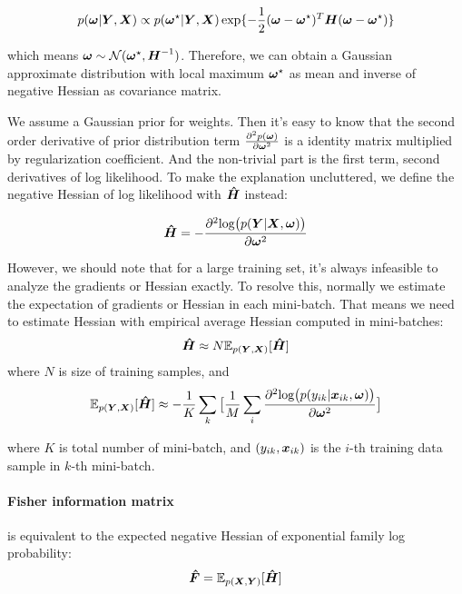\begin{equation}
\begin{aligned}\label{gaussian form}
p(\boldsymbol \omega | \boldsymbol Y, \boldsymbol X) \propto p(\boldsymbol \omega^\star|\boldsymbol Y, \boldsymbol X)\exp\{-\frac{1}{2}(\boldsymbol \omega - \boldsymbol \omega^\star)^T\boldsymbol H (\boldsymbol \omega - \boldsymbol \omega^\star)\}
\end{aligned}
\end{equation}

which means $\boldsymbol \omega \sim \mathcal N(\boldsymbol \omega^\star, \boldsymbol H ^{-1})$. Therefore, we can obtain a Gaussian approximate distribution with local maximum $\boldsymbol \omega^\star$ as mean and inverse of negative Hessian as covariance matrix.

We assume a Gaussian prior for weights. Then it's easy to know that the second order derivative of prior distribution term $\frac{\partial^2p(\boldsymbol \omega)}{\partial\boldsymbol \omega^2}$ is a identity matrix multiplied by regularization coefficient. And the non-trivial part is the first term, second derivatives of log likelihood. To make the explanation uncluttered, we define the negative Hessian of log likelihood with $\boldsymbol{\hat{H}}$ instead:

\[
\boldsymbol{\hat{H}} = -\frac{\partial^2\text{log}\big(p(\boldsymbol Y|\boldsymbol X, \boldsymbol \omega)\big)}{\partial \boldsymbol \omega^2}
\] 

However, we should note that for a large training set, it's always infeasible to analyze the gradients or Hessian exactly. To resolve this, normally we estimate the expectation of gradients or Hessian in each mini-batch. That means we need to estimate Hessian with empirical average Hessian computed in mini-batches:
\[
\boldsymbol{\hat H} \approx N\mathbb E_{p(\boldsymbol Y, \boldsymbol X)}[\boldsymbol{\hat{H}}]
\]
where $N$ is size of training samples, and 
\begin{equation} \label{expected hessian}
\mathbb E_{p(\boldsymbol Y, \boldsymbol X)}[\boldsymbol{\hat{H}}] \approx -\frac{1}{K}\sum_{k}\big[\frac{1}{M}\sum_{i}\frac{\partial^2\text{log}\big(p(y_{ik}|\boldsymbol x_{ik}, \boldsymbol \omega)\big)}{\partial \boldsymbol \omega^2}\big]
\end{equation}

where $K$ is total number of mini-batch, and $(y_{ik}, \boldsymbol x_{ik})$ is the $i$-th training data sample in $k$-th mini-batch. 

\paragraph{Fisher information matrix} is equivalent to the expected negative Hessian of exponential family log probability:
\[
\boldsymbol{\hat{F}} = \mathbb E_{p(\boldsymbol X, \boldsymbol Y)}[\boldsymbol{\hat{H}}]
\]

